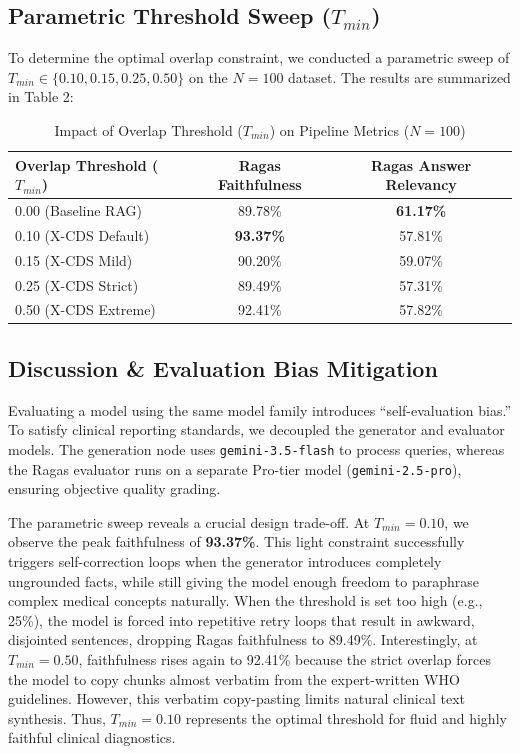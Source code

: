 \documentclass[sn-mathphys,Numbered]{sn-jnl}%
\begin{document}
\subsection{Parametric Threshold Sweep ($T_{min}$)}
To determine the optimal overlap constraint, we conducted a parametric sweep of $T_{min} \in \{0.10, 0.15, 0.25, 0.50\}$ on the $N=100$ dataset. The results are summarized in Table 2:

\begin{table}[ht]
\centering
\caption{Impact of Overlap Threshold ($T_{min}$) on Pipeline Metrics ($N=100$)}
\label{tab2}
\begin{tabular}{lcc}
\toprule
Overlap Threshold ($T_{min}$) & Ragas Faithfulness & Ragas Answer Relevancy \\
\midrule
0.00 (Baseline RAG) & 89.78\% & \textbf{61.17\%} \\
0.10 (X-CDS Default) & \textbf{93.37\%} & 57.81\% \\
0.15 (X-CDS Mild) & 90.20\% & 59.07\% \\
0.25 (X-CDS Strict) & 89.49\% & 57.31\% \\
0.50 (X-CDS Extreme) & 92.41\% & 57.82\% \\
\bottomrule
\end{tabular}
\end{table}

\subsection{Discussion \& Evaluation Bias Mitigation}
Evaluating a model using the same model family introduces ``self-evaluation bias.'' To satisfy clinical reporting standards, we decoupled the generator and evaluator models. The generation node uses \texttt{gemini-3.5-flash} to process queries, whereas the Ragas evaluator runs on a separate Pro-tier model (\texttt{gemini-2.5-pro}), ensuring objective quality grading.

The parametric sweep reveals a crucial design trade-off. At $T_{min} = 0.10$, we observe the peak faithfulness of \textbf{93.37\%}. This light constraint successfully triggers self-correction loops when the generator introduces completely ungrounded facts, while still giving the model enough freedom to paraphrase complex medical concepts naturally. When the threshold is set too high (e.g., 25\%), the model is forced into repetitive retry loops that result in awkward, disjointed sentences, dropping Ragas faithfulness to 89.49\%. Interestingly, at $T_{min} = 0.50$, faithfulness rises again to 92.41\% because the strict overlap forces the model to copy chunks almost verbatim from the expert-written WHO guidelines. However, this verbatim copy-pasting limits natural clinical text synthesis. Thus, $T_{min} = 0.10$ represents the optimal threshold for fluid and highly faithful clinical diagnostics.
\end{document}
